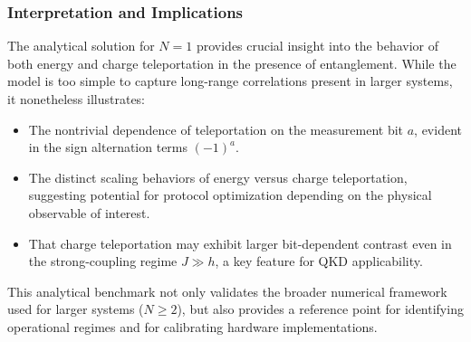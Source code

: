 \subsubsection{Interpretation and Implications}

The analytical solution for \( N=1 \) provides crucial insight into the behavior of both energy and charge teleportation in the presence of entanglement. While the model is too simple to capture long-range correlations present in larger systems, it nonetheless illustrates:

\begin{itemize}
    \item The nontrivial dependence of teleportation on the measurement bit \( a \), evident in the sign alternation terms \( (-1)^a \).
    \item The distinct scaling behaviors of energy versus charge teleportation, suggesting potential for protocol optimization depending on the physical observable of interest.
    \item That charge teleportation may exhibit larger bit-dependent contrast even in the strong-coupling regime \( J \gg h \), a key feature for QKD applicability.
\end{itemize}

This analytical benchmark not only validates the broader numerical framework used for larger systems (\( N \geq 2 \)), but also provides a reference point for identifying operational regimes and for calibrating hardware implementations.
